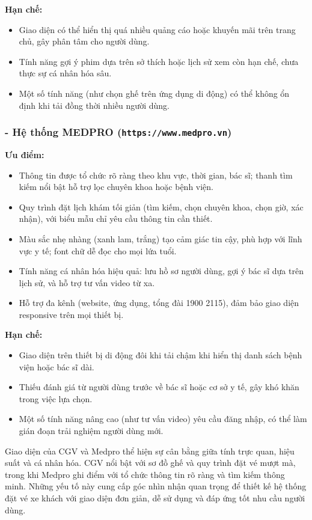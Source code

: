 \noindent\textbf{Hạn chế:}
\begin{itemize}
    \item Giao diện có thể hiển thị quá nhiều quảng cáo hoặc khuyến mãi trên trang chủ, gây phân tâm cho người dùng.
    \item Tính năng gợi ý phim dựa trên sở thích hoặc lịch sử xem còn hạn chế, chưa thực sự cá nhân hóa sâu.
    \item Một số tính năng (như chọn ghế trên ứng dụng di động) có thể không ổn định khi tải đồng thời nhiều người dùng.
\end{itemize}

\subsubsection*{- Hệ thống MEDPRO (\texttt{https://www.medpro.vn})}
\textbf{Ưu điểm:}
\begin{itemize}
    \item Thông tin được tổ chức rõ ràng theo khu vực, thời gian, bác sĩ; thanh tìm kiếm nổi bật hỗ trợ lọc chuyên khoa hoặc bệnh viện.
    \item Quy trình đặt lịch khám tối giản (tìm kiếm, chọn chuyên khoa, chọn giờ, xác nhận), với biểu mẫu chỉ yêu cầu thông tin cần thiết.
    \item Màu sắc nhẹ nhàng (xanh lam, trắng) tạo cảm giác tin cậy, phù hợp với lĩnh vực y tế; font chữ dễ đọc cho mọi lứa tuổi.
    \item Tính năng cá nhân hóa hiệu quả: lưu hồ sơ người dùng, gợi ý bác sĩ dựa trên lịch sử, và hỗ trợ tư vấn video từ xa.
    \item Hỗ trợ đa kênh (website, ứng dụng, tổng đài 1900 2115), đảm bảo giao diện responsive trên mọi thiết bị.
\end{itemize}

\noindent\textbf{Hạn chế:}
\begin{itemize}
    \item Giao diện trên thiết bị di động đôi khi tải chậm khi hiển thị danh sách bệnh viện hoặc bác sĩ dài.
    \item Thiếu đánh giá từ người dùng trước về bác sĩ hoặc cơ sở y tế, gây khó khăn trong việc lựa chọn.
    \item Một số tính năng nâng cao (như tư vấn video) yêu cầu đăng nhập, có thể làm gián đoạn trải nghiệm người dùng mới.
\end{itemize}
Giao diện của CGV và Medpro thể hiện sự cân bằng giữa tính trực quan, hiệu suất và cá nhân hóa. CGV nổi bật với sơ đồ ghế và quy trình đặt vé mượt mà, trong khi Medpro ghi điểm với tổ chức thông tin rõ ràng và tìm kiếm thông minh. Những yếu tố này cung cấp góc nhìn nhận quan trọng để thiết kế hệ thống đặt vé xe khách với giao diện đơn giản, dễ sử dụng và đáp ứng tốt nhu cầu người dùng.

